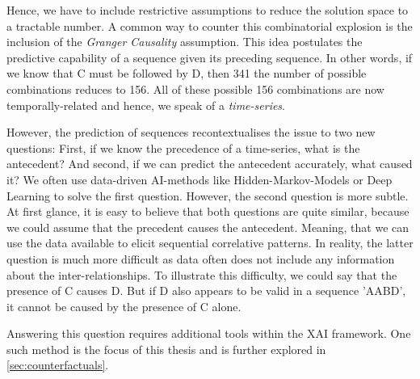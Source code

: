 \documentclass[./../../paper.tex]{subfiles}
\begin{document}
Hence, we have to include restrictive assumptions to reduce the solution space to a tractable number. A common way to counter this combinatorial explosion is the inclusion of the \emph{Granger Causality} assumption\cite{anastasiou_CausalityDistanceMeasures_2021}. 
This idea postulates the predictive capability of a sequence given its preceding sequence. 
In other words, if we know that C must be followed by D, then 341 the number of possible combinations reduces to 156. All of these possible 156 combinations are now temporally-related and hence, we speak of a \emph{time-series}.


However, the prediction of sequences recontextualises the issue to two new questions: 
First, if we know the precedence of a time-series, what is the antecedent? 
And second, if we can predict the antecedent accurately, what caused it? 
We often use data-driven AI-methods like Hidden-Markov-Models or Deep Learning to solve the first question. 
However, the second question is more subtle. At first glance, it is easy to believe that both questions are quite similar, because we could assume that the precedent causes the antecedent. Meaning, that we can use the data available to elicit sequential correlative patterns. 
In reality, the latter question is much more difficult as data often does not include any information about the inter-relationships. 
To illustrate this difficulty, we could say that the presence of C causes D. 
But if D also appears to be valid in a sequence 'AABD', it cannot be caused by the presence of C alone. 

Answering this question requires additional tools within the \gls{XAI} framework. 
One such method is the focus of this thesis and is further explored in \autoref{sec:counterfactuals}.
\end{document}
